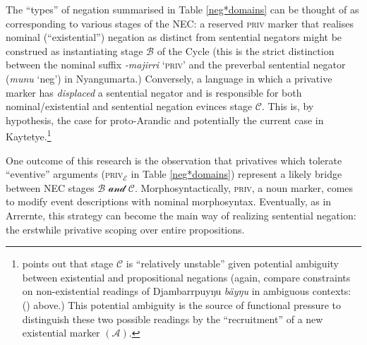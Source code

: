 The ``types'' of negation summarised in Table \ref{neg*domains} can be thought of as corresponding to various stages of the NEC: a reserved \textsc{priv} marker that realises nominal (``existential'') negation as distinct from sentential negators might be construed as instantiating stage $ \mathcal B  $ of the Cycle (this is the strict distinction between the nominal suffix \textit{-majirri} `\textsc{priv}' and the preverbal sentential negator (\textit{munu} `\gls{neg}') in Nyangumarta.) Conversely, a language in which a privative marker has \textit{displaced} a sentential negator and is responsible for both nominal/existential and sentential negation evinces stage $ \mathcal C $. This is, by hypothesis, the case for proto-Arandic and potentially the current case in Kaytetye.\footnote{\citet[19]{Croft1991} points out that stage $ \mathcal{C} $ is ``relatively unstable'' given potential ambiguity between existential and propositional negations (again, compare constraints on non-existential readings of Djambarrpuyŋu \textit{bäyŋu} in ambiguous contexts: () above.) This potential ambiguity is the source of functional pressure to distinguish these two possible readings by the ``recruitment'' of a new existential marker $ (\mathcal A) $.}
	
One outcome of this research is the observation that privatives which tolerate ``eventive'' arguments (\textsc{priv$ _{\mathcal E} $} in Table \ref{neg*domains}) represent a likely bridge between NEC stages $ \mathcal{B\text{ and }C} $. Morphosyntactically, \textsc{priv}, a noun marker, comes to modify event descriptions with nominal morphosyntax. Eventually, as in Arrernte, this strategy can become the main way of realizing sentential negation: the erstwhile privative scoping over entire propositions.


